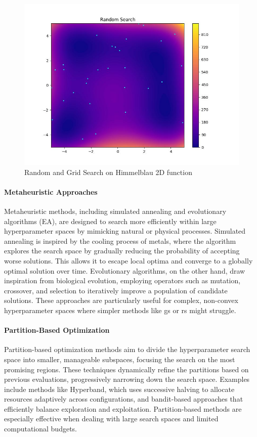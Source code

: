 \begin{figure}
    \centering
    \includegraphics[width=0.5\linewidth]{assets/img/chap_2/plots/random_search.jpg}
    \caption{Random and Grid Search on Himmelblau 2D function}
    \label{fig:rs_gs_eg}
\end{figure}
\FloatBarrier

\paragraph{Metaheuristic Approaches}  

Metaheuristic methods, including simulated annealing and evolutionary algorithms (EA), are designed to search more efficiently within large hyperparameter spaces by mimicking natural or physical processes. Simulated annealing is inspired by the cooling process of metals, where the algorithm explores the search space by gradually reducing the probability of accepting worse solutions. This allows it to escape local optima and converge to a globally optimal solution over time. Evolutionary algorithms, on the other hand, draw inspiration from biological evolution, employing operators such as mutation, crossover, and selection to iteratively improve a population of candidate solutions. These approaches are particularly useful for complex, non-convex hyperparameter spaces where simpler methods like \acrshort{gs} or \acrshort{rs} might struggle.

\paragraph{Partition-Based Optimization}  
 

Partition-based optimization methods aim to divide the hyperparameter search space into smaller, manageable subspaces, focusing the search on the most promising regions. These techniques dynamically refine the partitions based on previous evaluations, progressively narrowing down the search space. Examples include methods like Hyperband, which uses successive halving to allocate resources adaptively across configurations, and bandit-based approaches that efficiently balance exploration and exploitation. Partition-based methods are especially effective when dealing with large search spaces and limited computational budgets.

